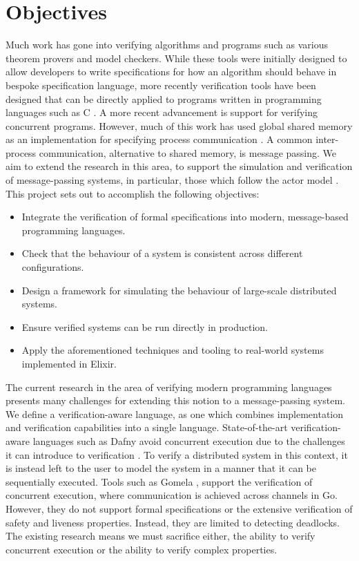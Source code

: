 \section{Objectives}
Much work has gone into verifying algorithms and programs such as various theorem provers and model checkers. While these tools were initially designed to allow developers to write specifications for how an algorithm should behave in bespoke specification language, more recently verification tools have been designed that can be directly applied to programs written in programming languages such as C \cite{c_to_promela}. A more recent advancement is support for verifying concurrent programs. However, much of this work has used global shared memory as an implementation for specifying process communication \cite{java_pathfinder}. A common inter-process communication, alternative to shared memory, is message passing. We aim to extend the research in this area, to support the simulation and verification of message-passing systems, in particular, those which follow the actor model \cite{actor}. This project sets out to accomplish the following objectives:
\begin{itemize}
    \item Integrate the verification of formal specifications into modern, message-based programming languages.
    \item Check that the behaviour of a system is consistent across different configurations.
    \item Design a framework for simulating the behaviour of large-scale distributed systems.
    \item Ensure verified systems can be run directly in production.
    \item Apply the aforementioned techniques and tooling to real-world systems implemented in Elixir.
\end{itemize}
The current research in the area of verifying modern programming languages presents many challenges for extending this notion to a message-passing system. We define a verification-aware language, as one which combines implementation and verification capabilities into a single language.  State-of-the-art verification-aware languages such as Dafny avoid concurrent execution due to the challenges it can introduce to verification \cite{dafny_concurrency}. To verify a distributed system in this context, it is instead left to the user to model the system in a manner that it can be sequentially executed. Tools such as Gomela \cite{gomela}, support the verification of concurrent execution, where communication is achieved across channels in Go. However, they do not support formal specifications or the extensive verification of safety and liveness properties. Instead, they are limited to detecting deadlocks. The existing research means we must sacrifice either, the ability to verify concurrent execution or the ability to verify complex properties.
